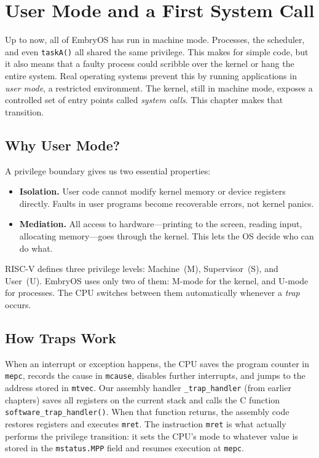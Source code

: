\chapter{User Mode and a First System Call}

Up to now, all of EmbryOS has run in machine mode.  Processes, the scheduler,
and even \texttt{taskA()} all shared the same privilege.  This makes for simple
code, but it also means that a faulty process could scribble over the kernel or
hang the entire system.  Real operating systems prevent this by running
applications in \emph{user mode}, a restricted environment.  The kernel, still
in machine mode, exposes a controlled set of entry points called
\emph{system calls}.  This chapter makes that transition.

\section{Why User Mode?}

A privilege boundary gives us two essential properties:

\begin{itemize}
  \item \textbf{Isolation.} User code cannot modify kernel memory or device
        registers directly.  Faults in user programs become recoverable errors,
        not kernel panics.
  \item \textbf{Mediation.} All access to hardware---printing to the screen,
        reading input, allocating memory---goes through the kernel.  This lets
        the OS decide who can do what.
\end{itemize}

RISC-V defines three privilege levels: Machine~(M), Supervisor~(S), and
User~(U).  EmbryOS uses only two of them: M-mode for the kernel, and U-mode for
processes.  The CPU switches between them automatically whenever a \emph{trap}
occurs.

\section{How Traps Work}

When an interrupt or exception happens, the CPU saves the program counter in
\texttt{mepc}, records the cause in \texttt{mcause}, disables further
interrupts, and jumps to the address stored in \texttt{mtvec}.  Our assembly
handler \texttt{\_trap\_handler} (from earlier chapters) saves all registers on
the current stack and calls the C function
\texttt{software\_trap\_handler()}.  When that function returns, the assembly
code restores registers and executes \texttt{mret}.  The instruction
\texttt{mret} is what actually performs the privilege transition: it sets the
CPU's mode to whatever value is stored in the \texttt{mstatus.MPP} field and
resumes execution at \texttt{mepc}.

